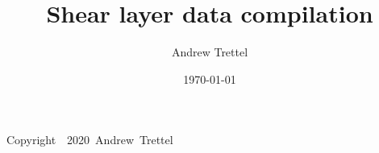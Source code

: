 \documentclass[12pt,oneside]{book}
\title{Shear layer data compilation}
\date{\today}
\author{Andrew Trettel}
\begin{document}
\frontmatter
\maketitle

\clearpage\null\vfill
\pagestyle{empty}
\begin{center}
Copyright~\textcopyright~2020~Andrew~Trettel
\end{center}

\tableofcontents

\mainmatter


\appendix


\end{document}
